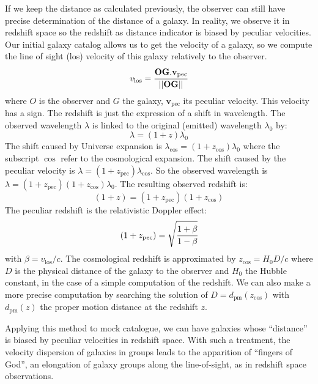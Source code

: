 If we keep the distance as calculated previously, the observer can still have
precise determination of the distance of a galaxy. In reality, we observe it in
redshift space so the redshift as distance indicator is biased by peculiar
velocities. Our initial galaxy catalog allows us to get the velocity of a
galaxy, so we compute the line of sight (los) velocity of this galaxy
relatively to the observer.
%
\begin{equation}
v_\mathrm{los}=\cfrac{\textbf{OG}.\textbf{v}_\mathrm{pec}}
    {\left|\left|\textbf{OG}\right|\right|}
\end{equation}
%
where $O$ is the observer and $G$ the galaxy, $\textbf{v}_{\mathrm{pec}}$ its
peculiar velocity. This velocity has a sign. The redshift is just the
expression of a shift in wavelength. The observed wavelength $\lambda$ is
linked to the original (emitted) wavelength $\lambda_0$ by:
%
\begin{equation}
    \lambda=(1+z)\lambda_0
\end{equation}
%
The shift caused by Universe expansion is
$\lambda_{\cos}=(1+z_{\cos})\lambda_0$ where the subscript $\cos$ refer to the
cosmological expansion. The shift caused by the peculiar velocity is
$\lambda=(1+z_{\mathrm{pec}})\lambda_{\cos}$. So the observed wavelength is
$\lambda=(1+z_{\mathrm{pec}})(1+z_{\cos})\lambda_0$. The resulting observed
redshift is:
%
\begin{equation}
    (1+z)=(1+z_{\mathrm{pec}})(1+z_{\cos})
\end{equation}
%
The peculiar redshift is the relativistic Doppler effect:
%
\begin{equation}
    (1+z_{\mathrm{pec}})=\sqrt{\cfrac{1+\beta}{1-\beta}}
\end{equation}
%
with $\beta={v_{\mathrm{los}}}/{c}$. The cosmological redshift is approximated
by $z_{\cos}={H_0}{D}/c$ where $D$ is the physical distance of the galaxy to
the observer and $H_0$ the Hubble constant, in the case of a simple computation
of the redshift. We can also make a more precise computation by searching the
solution of $D=d_\mathrm{pm} \left(z_{\cos}\right)$ with $d_\mathrm{pm}
\left(z\right)$ the proper motion distance at the redshift $z$.

Applying this method to mock catalogue, we can have galaxies whose ``distance''
is biased by peculiar velocities in redshift space. With such a treatment, the
velocity dispersion of galaxies in groups leads to the apparition of ``fingers
of God'', an elongation of galaxy groups along the line-of-sight, as in
redshift space observations.

